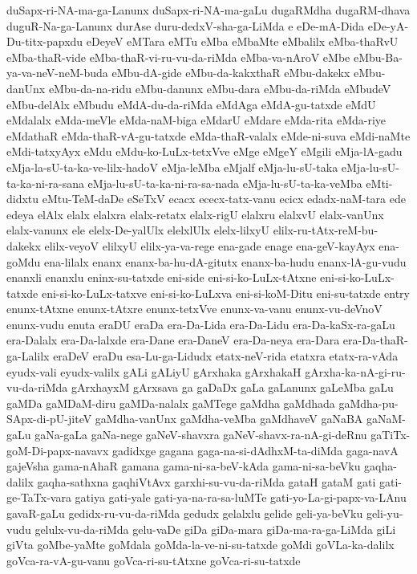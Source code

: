 {duSapx-ri-NA-ma-ga-Lanunx
duSapx-ri-NA-ma-gaLu
dugaRMdha
dugaRM-dhava
duguR-Na-ga-Lanunx
durAse
duru-dedxV-sha-ga-LiMda
e
eDe-mA-Dida
eDe-yA-Du-titx-papxdu
eDeyeV
eMTara
eMTu
eMba
eMbaMte
eMbalilx
eMba-thaRvU
eMba-thaR-vide
eMba-thaR-vi-ru-vu-da-riMda
eMba-va-nAroV
eMbe
eMbu-Ba-ya-va-neV-neM-buda
eMbu-dA-gide
eMbu-da-kakxthaR
eMbu-dakekx
eMbu-danUnx
eMbu-da-na-ridu
eMbu-danunx
eMbu-dara
eMbu-da-riMda
eMbudeV
eMbu-delAlx
eMbudu
eMdA-du-da-riMda
eMdAga
eMdA-gu-tatxde
eMdU
eMdalalx
eMda-meVle
eMda-naM-biga
eMdarU
eMdare
eMda-rita
eMda-riye
eMdathaR
eMda-thaR-vA-gu-tatxde
eMda-thaR-valalx
eMde-ni-suva
eMdi-naMte
eMdi-tatxyAyx
eMdu
eMdu-ko-LuLx-tetxVve
eMge
eMgeY
eMgili
eMja-lA-gadu
eMja-la-sU-ta-ka-ve-lilx-hadoV
eMja-leMba
eMjalf
eMja-lu-sU-taka
eMja-lu-sU-ta-ka-ni-ra-sana
eMja-lu-sU-ta-ka-ni-ra-sa-nada
eMja-lu-sU-ta-ka-veMba
eMti-didxtu
eMtu-TeM-daDe
eSeTxV
ecacx
ececx-tatx-vanu
ecicx
edadx-naM-tara
ede
edeya
elAlx
elalx
elalxra
elalx-retatx
elalx-rigU
elalxru
elalxvU
elalx-vanUnx
elalx-vanunx
ele
elelx-De-yalUlx
elelxlUlx
elelx-lilxyU
elilx-ru-tAtx-reM-bu-dakekx
elilx-veyoV
elilxyU
elilx-ya-va-rege
ena-gade
enage
ena-geV-kayAyx
ena-goMdu
ena-lilalx
enanx
enanx-ba-hu-dA-gitutx
enanx-ba-hudu
enanx-lA-gu-vudu
enanxli
enanxlu
eninx-su-tatxde
eni-side
eni-si-ko-LuLx-tAtxne
eni-si-ko-LuLx-tatxde
eni-si-ko-LuLx-tatxve
eni-si-ko-LuLxva
eni-si-koM-Ditu
eni-su-tatxde
entry
enunx-tAtxne
enunx-tAtxre
enunx-tetxVve
enunx-va-vanu
enunx-vu-deVnoV
enunx-vudu
enuta
eraDU
eraDa
era-Da-Lida
era-Da-Lidu
era-Da-kaSx-ra-gaLu
era-Dalalx
era-Da-lalxde
era-Dane
era-DaneV
era-Da-neya
era-Dara
era-Da-thaR-ga-Lalilx
eraDeV
eraDu
esa-Lu-ga-Lidudx
etatx-neV-rida
etatxra
etatx-ra-vAda
eyudx-vali
eyudx-valilx
gALi
gALiyU
gArxhaka
gArxhakaH
gArxha-ka-nA-gi-ru-vu-da-riMda
gArxhayxM
gArxsava
ga
gaDaDx
gaLa
gaLanunx
gaLeMba
gaLu
gaMDa
gaMDaM-diru
gaMDa-nalalx
gaMTege
gaMdha
gaMdhada
gaMdha-pu-SApx-di-pU-jiteV
gaMdha-vanUnx
gaMdha-veMba
gaMdhaveV
gaNaBA
gaNaM-gaLu
gaNa-gaLa
gaNa-nege
gaNeV-shavxra
gaNeV-shavx-ra-nA-gi-deRnu
gaTiTx-goM-Di-papx-navavx
gadidxge
gagana
gaga-na-si-dAdhxM-ta-diMda
gaga-navA
gajeVsha
gama-nAhaR
gamana
gama-ni-sa-beV-kAda
gama-ni-sa-beVku
gaqha-dalilx
gaqha-sathxna
gaqhiVtAvx
garxhi-su-vu-da-riMda
gataH
gataM
gati
gati-ge-TaTx-vara
gatiya
gati-yale
gati-ya-na-ra-sa-luMTe
gati-yo-La-gi-papx-va-LAnu
gavaR-gaLu
gedidx-ru-vu-da-riMda
gedudx
gelalxlu
gelide
geli-ya-beVku
geli-yu-vudu
gelulx-vu-da-riMda
gelu-vaDe
giDa
giDa-mara
giDa-ma-ra-ga-LiMda
giLi
giVta
goMbe-yaMte
goMdala
goMda-la-ve-ni-su-tatxde
goMdi
goVLa-ka-dalilx
goVca-ra-vA-gu-vanu
goVca-ri-su-tAtxne
goVca-ri-su-tatxde
}
